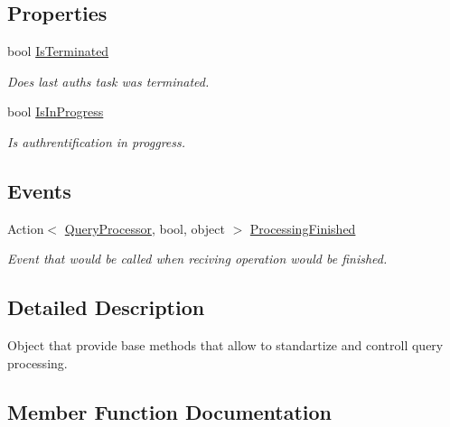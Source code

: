 \subsection*{Properties}
\begin{DoxyCompactItemize}
\item 
bool \mbox{\hyperlink{class_uniform_queries_1_1_query_processor_a6c7b2f71bee989944cb95f927ed3bdfd}{Is\+Terminated}}
\begin{DoxyCompactList}\small\item\em Does last auth\textquotesingle{}s task was terminated. \end{DoxyCompactList}\item 
bool \mbox{\hyperlink{class_uniform_queries_1_1_query_processor_a313a194b0608de7f02281824587dd1ac}{Is\+In\+Progress}}
\begin{DoxyCompactList}\small\item\em Is authrentification in proggress. \end{DoxyCompactList}\end{DoxyCompactItemize}
\subsection*{Events}
\begin{DoxyCompactItemize}
\item 
Action$<$ \mbox{\hyperlink{class_uniform_queries_1_1_query_processor}{Query\+Processor}}, bool, object $>$ \mbox{\hyperlink{class_uniform_queries_1_1_query_processor_a6892127a6d09754370570c124a2a5452}{Processing\+Finished}}
\begin{DoxyCompactList}\small\item\em Event that would be called when reciving operation would be finished. \end{DoxyCompactList}\end{DoxyCompactItemize}


\subsection{Detailed Description}
Object that provide base methods that allow to standartize and controll query processing. 



\subsection{Member Function Documentation}
\mbox{\label{class_uniform_queries_1_1_query_processor_ad3338c48d35da2f6ddbe2daf736d34a8}} 
